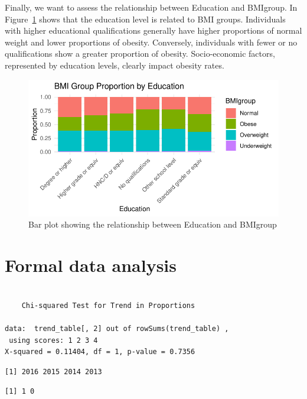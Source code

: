 \documentclass[
  letterpaper,
  DIV=11,
  numbers=noendperiod]{scrartcl}
\begin{document}
Finally, we want to assess the relationship between Education and
BMIgroup. In Figure~\ref{fig-bar3} shows that the education level is
related to BMI groups. Individuals with higher educational
qualifications generally have higher proportions of normal weight and
lower proportions of obesity. Conversely, individuals with fewer or no
qualifications show a greater proportion of obesity. Socio-economic
factors, represented by education levels, clearly impact obesity rates.

\begin{figure}

{\centering \includegraphics{Data-analysis-12-main_files/figure-pdf/fig-bar3-1.pdf}

}

\caption{\label{fig-bar3}Bar plot showing the relationship between
Education and BMIgroup}

\end{figure}

\hypertarget{sec-formdata}{%
\section{Formal data analysis}\label{sec-formdata}}

\begin{verbatim}

    Chi-squared Test for Trend in Proportions

data:  trend_table[, 2] out of rowSums(trend_table) ,
 using scores: 1 2 3 4
X-squared = 0.11404, df = 1, p-value = 0.7356
\end{verbatim}

\begin{verbatim}
[1] 2016 2015 2014 2013
\end{verbatim}

\begin{verbatim}
[1] 1 0
\end{verbatim}
\end{document}
